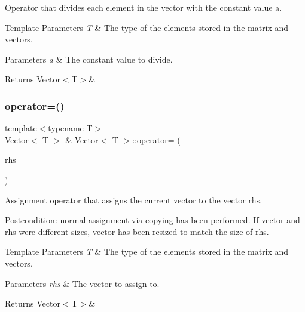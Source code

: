 Operator that divides each element in the vector with the constant value {\ttfamily a}. 


\begin{DoxyTemplParams}{Template Parameters}
{\em T} & The type of the elements stored in the matrix and vectors. \\
\hline
\end{DoxyTemplParams}

\begin{DoxyParams}{Parameters}
{\em a} & The constant value to divide. \\
\hline
\end{DoxyParams}
\begin{DoxyReturn}{Returns}
Vector$<$\+T$>$\& 
\end{DoxyReturn}
\mbox{\label{classVector_aa44e8e04a723f2c0bd9382a3bfa46e7c}} 
\subsubsection{\texorpdfstring{operator=()}{operator=()}\hspace{0.1cm}{\footnotesize\ttfamily [1/2]}}
{\footnotesize\ttfamily template$<$typename T$>$ \\
\mbox{\hyperlink{classVector}{Vector}}$<$ T $>$ \& \mbox{\hyperlink{classVector}{Vector}}$<$ T $>$\+::operator= (\begin{DoxyParamCaption}\item[{const \mbox{\hyperlink{classVector}{Vector}}$<$ T $>$ \&}]{rhs }\end{DoxyParamCaption})\hspace{0.3cm}{\ttfamily [inline]}}



Assignment operator that assigns the current vector to the vector {\ttfamily rhs}. 

Postcondition\+: normal assignment via copying has been performed. If vector and rhs were different sizes, vector has been resized to match the size of {\ttfamily rhs}.


\begin{DoxyTemplParams}{Template Parameters}
{\em T} & The type of the elements stored in the matrix and vectors. \\
\hline
\end{DoxyTemplParams}

\begin{DoxyParams}{Parameters}
{\em rhs} & The vector to assign to. \\
\hline
\end{DoxyParams}
\begin{DoxyReturn}{Returns}
Vector$<$\+T$>$\& 
\end{DoxyReturn}
\mbox{\label{classVector_a6bbf5f187006ef2567fdcebd37ebfa97}} 
